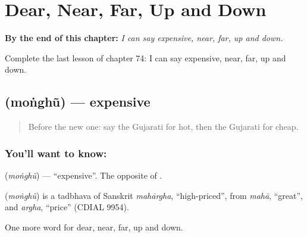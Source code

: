 
\chapter{Dear, Near, Far, Up and Down}
\label{ch:gu-dear-near-far-up-and-down}

\begin{chapteropening}
\textbf{By the end of this chapter:} \emph{I can say expensive, near, far, up and down.}

Complete the last lesson of chapter 74: I can say expensive, near, far, up and down.
\end{chapteropening}

\section[\texorpdfstring{\gu{મોંઘું} (moṅghũ)}{મોંઘું (moṅghũ)}]{ (moṅghũ) — expensive}

\label{lesson:GU-C74-expensive}



\begin{quote}
Before the new one: say the Gujarati for hot, then the Gujarati for cheap.
\end{quote}

\subsection*{You'll want to know: }
\textbf{} (\emph{moṅghũ}) — \textquotedblleft{}expensive\textquotedblright{}. The opposite of \textbf{}.

\begin{cousinweb}
\textbf{} (\emph{moṅghũ}) is a tadbhava of Sanskrit \emph{mahārgha}, \textquotedblleft{}high-priced\textquotedblright{}, from \emph{mahā}, \textquotedblleft{}great\textquotedblright{}, and \emph{argha}, \textquotedblleft{}price\textquotedblright{} (CDIAL 9954).
\end{cousinweb}

\begin{grammarlens}[title={What you've built}]
One more word for dear, near, far, up and down.
\end{grammarlens}

